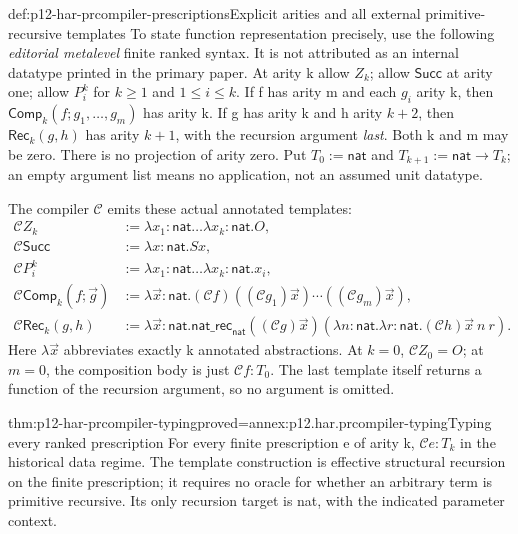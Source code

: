 \begin{hbdefinition}{def:p12-har-prcompiler-prescriptions}{Explicit arities and all external primitive-recursive templates}
To state function representation precisely, use the following
\emph{editorial metalevel} finite ranked syntax. It is not attributed as
an internal datatype printed in the primary paper. At arity k allow
\(Z_k\); allow \(\mathsf{Succ}\) at arity one; allow
\(P_i^k\) for \(k\ge1\) and \(1\le i\le k\). If f has arity m
and each \(g_i\) arity k, then \(\mathsf{Comp}_k(f;g_1,\ldots,g_m)\)
has arity k. If g has arity k and h arity \(k+2\), then
\(\mathsf{Rec}_k(g,h)\) has arity \(k+1\), with the recursion
argument \emph{last}. Both k and m may be zero. There is no projection
of arity zero. Put \(T_0:=\mathsf{nat}\) and
\(T_{k+1}:=\mathsf{nat}\to T_k\); an empty argument list means
no application, not an assumed unit datatype.

The compiler \(\mathcal C\) emits these actual annotated templates:
\[
\begin{aligned}
 \mathcal C Z_k&:=\lambda x_1:\mathsf{nat}\ldots\lambda x_k:\mathsf{nat}.O,\\
 \mathcal C\mathsf{Succ}&:=\lambda x:\mathsf{nat}.Sx,\\
 \mathcal C P_i^k&:=\lambda x_1:\mathsf{nat}\ldots\lambda x_k:\mathsf{nat}.x_i,\\
 \mathcal C\mathsf{Comp}_k(f;\vec g)&:=
   \lambda\vec x:\mathsf{nat}.(\mathcal C f)
           ((\mathcal C g_1)\vec x)\cdots((\mathcal C g_m)\vec x),\\
 \mathcal C\mathsf{Rec}_k(g,h)&:=\lambda\vec x:\mathsf{nat}.
   \mathsf{nat\_rec}_{\mathsf{nat}}
      ((\mathcal C g)\vec x)
      (\lambda n:\mathsf{nat}.\lambda r:\mathsf{nat}.
                         (\mathcal C h)\vec x\ n\ r).
\end{aligned}
\]
Here \(\lambda\vec x\) abbreviates exactly k annotated abstractions.
At \(k=0\), \(\mathcal C Z_0=O\); at \(m=0\), the composition
body is just \(\mathcal C f:T_0\). The last template itself returns a
function of the recursion argument, so no argument is omitted.
\end{hbdefinition}

\begin{hblemma}{thm:p12-har-prcompiler-typing}{proved=annex:p12.har.prcompiler-typing}{Typing every ranked prescription}
For every finite prescription e of arity k,
\(\mathcal C e:T_k\) in the historical data regime. The template
construction is effective structural recursion on the finite prescription;
it requires no oracle for whether an arbitrary term is primitive recursive.
Its only recursion target is nat, with the indicated parameter context.
\end{hblemma}

